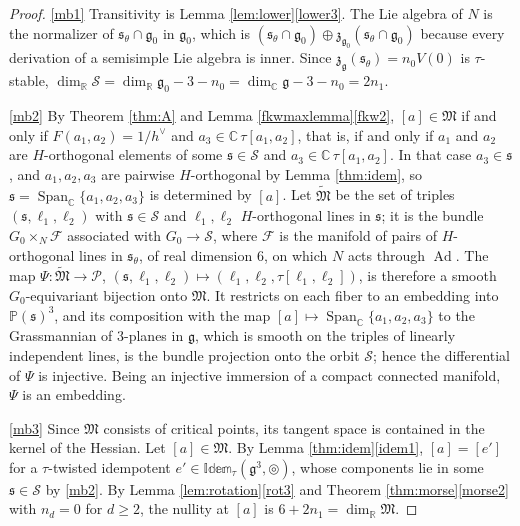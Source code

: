 \documentclass [leqno, 10pt]{amsart}
\theoremstyle{definition}
\numberwithin{equation}{section}
\newcommand{\idem}{\mathbb{Idem}}
\newcommand{\tmlt}{\circledcirc}
\newcommand{\spn}{\operatorname{Span}}
\newcommand{\proj}{\mathbb{P}}
\newcommand{\g}{\mathfrak{g}}
\newcommand{\Ad}{\operatorname{Ad}}
\newcommand{\rea}{\mathbb R}
\newcommand{\com}{\mathbb C}
\newcommand{\gz}{\g_{0}}
\newcommand{\hv}{h^\vee}
\newcommand{\subs}{\mathfrak{s}}
\begin{document}
\begin{proof}
\ref{mb1} Transitivity is Lemma \ref{lem:lower}\ref{lower3}. The Lie algebra of $N$ is the normalizer of $\subs_{\theta} \cap \gz$ in $\gz$, which is $(\subs_{\theta} \cap \gz) \oplus \mathfrak{z}_{\gz}(\subs_{\theta} \cap \gz)$ because every derivation of a semisimple Lie algebra is inner. Since $\mathfrak{z}_{\g}(\subs_{\theta}) = n_{0}V(0)$ is $\tau$-stable, $\dim_{\rea}\mathcal{S} = \dim_{\rea}\gz - 3 - n_{0} = \dim_{\com}\g - 3 - n_{0} = 2n_{1}$.

\ref{mb2} By Theorem \ref{thm:A} and Lemma \ref{fkwmaxlemma}\ref{fkw2}, $[a] \in \mathfrak{M}$ if and only if $F(a_{1}, a_{2}) = 1/\hv$ and $a_{3} \in \com\,\tau[a_{1}, a_{2}]$, that is, if and only if $a_{1}$ and $a_{2}$ are $H$-orthogonal elements of some $\subs \in \mathcal{S}$ and $a_{3} \in \com\,\tau[a_{1}, a_{2}]$. In that case $a_{3} \in \subs$, and $a_{1}, a_{2}, a_{3}$ are pairwise $H$-orthogonal by Lemma \ref{thm:idem}, so $\subs = \spn_{\com}\{a_{1}, a_{2}, a_{3}\}$ is determined by $[a]$. Let $\widetilde{\mathfrak{M}}$ be the set of triples $(\subs, \ell_{1}, \ell_{2})$ with $\subs \in \mathcal{S}$ and $\ell_{1}, \ell_{2}$ $H$-orthogonal lines in $\subs$; it is the bundle $G_{0} \times_{N} \mathcal{F}$ associated with $G_{0} \to \mathcal{S}$, where $\mathcal{F}$ is the manifold of pairs of $H$-orthogonal lines in $\subs_{\theta}$, of real dimension $6$, on which $N$ acts through $\Ad$. The map $\Psi:\widetilde{\mathfrak{M}} \to \mathcal{P}$, $(\subs, \ell_{1}, \ell_{2}) \mapsto (\ell_{1}, \ell_{2}, \tau[\ell_{1}, \ell_{2}])$, is therefore a smooth $G_{0}$-equivariant bijection onto $\mathfrak{M}$. It restricts on each fiber to an embedding into $\proj(\subs)^{3}$, and its composition with the map $[a] \mapsto \spn_{\com}\{a_{1}, a_{2}, a_{3}\}$ to the Grassmannian of $3$-planes in $\g$, which is smooth on the triples of linearly independent lines, is the bundle projection onto the orbit $\mathcal{S}$; hence the differential of $\Psi$ is injective. Being an injective immersion of a compact connected manifold, $\Psi$ is an embedding.

\ref{mb3} Since $\mathfrak{M}$ consists of critical points, its tangent space is contained in the kernel of the Hessian. Let $[a] \in \mathfrak{M}$. By Lemma \ref{thm:idem}\ref{idem1}, $[a] = [e']$ for a $\tau$-twisted idempotent $e' \in \idem_{\tau}(\g^{3}, \tmlt)$, whose components lie in some $\subs \in \mathcal{S}$ by \ref{mb2}. By Lemma \ref{lem:rotation}\ref{rot3} and Theorem \ref{thm:morse}\ref{morse2} with $n_{d} = 0$ for $d \geq 2$, the nullity at $[a]$ is $6 + 2n_{1} = \dim_{\rea}\mathfrak{M}$.
\end{proof}
\end{document}
